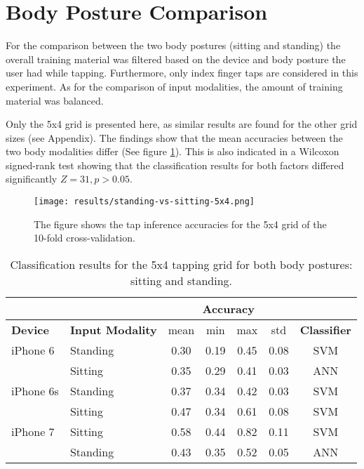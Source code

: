 \section{Body Posture Comparison}
For the comparison between the two body postures (sitting and standing) the overall training material was filtered based on the device and body posture the user had while tapping. Furthermore, only index finger taps are considered in this experiment. As for the comparison of input modalities, the amount of training material was balanced.

Only the 5x4 grid is presented here, as similar results are found for the other grid sizes (see Appendix). The findings show that the mean accuracies between the two body modalities differ (See figure \ref{fig:bodypos5x4}). This is also indicated in a Wilcoxon signed-rank test showing that the classification results for both factors differed significantly $Z = 31, p > 0.05$.

\begin{figure}[h!]
  \centering
  \texttt{[image: results/standing-vs-sitting-5x4.png]}
  \caption{The figure shows the tap inference accuracies for the 5x4 grid of the 10-fold cross-validation.} \label{fig:bodypos5x4}
\end{figure}

\begin{table}[h!]
  \centering
\begin{tabular}{|l|l|c|c|c|c|c|}
  \cline{3-6}
  \multicolumn{2}{c}{} & \multicolumn{4}{|c|}{\textbf{Accuracy}}  \\
  \hline
  \textbf{Device} & \textbf{Input Modality} & mean &   min &   max  & std &  \textbf{Classifier} \\
  \hline
  iPhone 6 & Standing &      0.30 &     0.19 &     0.45 &     0.08 &  SVM \\
  & Sitting &      0.35 &     0.29 &     0.41 &     0.03 &  ANN \\
  \hline
iPhone 6s   & Standing &      0.37 &     0.34 &     0.42 &     0.03 &  SVM \\
& Sitting &      0.47 &     0.34 &     0.61 &     0.08 &  SVM \\
  \hline
  iPhone 7 &    Sitting     &      0.58 &     0.44 &     0.82 &     0.11 &  SVM\\
  & Standing &      0.43 &     0.35 &     0.52 &     0.05 &  ANN \\
  \hline
\end{tabular}
  \caption{Classification results for the 5x4 tapping grid for both body postures: sitting and standing.}
\end{table}


